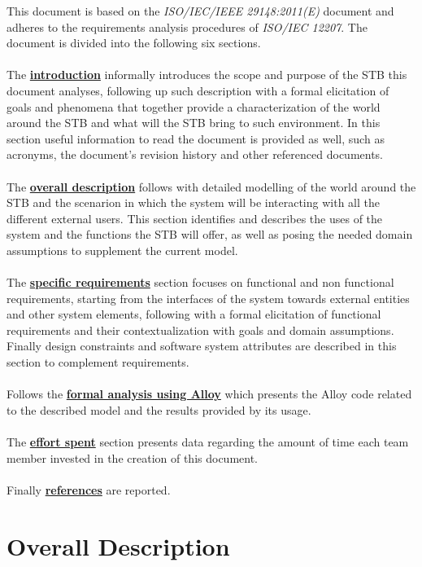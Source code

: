 \documentclass[11pt]{article}
\begin{document}
This document is based on the \textit{ISO/IEC/IEEE 29148:2011(E)} document and adheres to the requirements analysis procedures of \textit{ISO/IEC 12207}. The document is divided into the following six sections. \\
\\
The \hyperref[section:introduction]{\textbf{introduction}} informally introduces the scope and purpose of the STB this document analyses, following up such description with a formal elicitation of goals and phenomena that together provide a characterization of the world around the STB and what will the STB bring to such environment. In this section useful information to read the document is provided as well, such as acronyms, the document's revision history and other referenced documents. \\
\\
The \hyperref[section:overallDescription]{\textbf{overall description}} follows with detailed modelling of the world around the STB and the scenarion in which the system will be interacting with all the different external users. This section identifies and describes the uses of the system and the functions the STB will offer, as well as posing the needed domain assumptions to supplement the current model. \\
\\
The \hyperref[section:specificRequirements]{\textbf{specific requirements}} section focuses on functional and non functional requirements, starting from the interfaces of the system towards external entities and other system elements, following with a formal elicitation of functional requirements and their contextualization with goals and domain assumptions. Finally design constraints and software system attributes are described in this section to complement requirements. \\
\\
Follows the \hyperref[section:alloy]{\textbf{formal analysis using Alloy}} which presents the Alloy code related to the described model and the results provided by its usage. \\
\\
The \hyperref[section:effort]{\textbf{effort spent}} section presents data regarding the amount of time each team member invested in the creation of this document. \\
\\
Finally \hyperref[section:references]{\textbf{references}} are reported.

\section{Overall Description}
\label{section:overallDescription}
\end{document}
